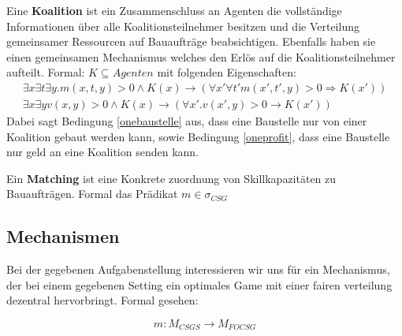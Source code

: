 \begin{definition}[Koalition]
  Eine \textbf{Koalition} ist ein Zusammenschluss an Agenten die vollständige Informationen über alle Koalitionsteilnehmer besitzen und die Verteilung gemeinsamer Ressourcen auf Bauaufträge beabsichtigen. Ebenfalls haben sie einen gemeinsamen Mechanismus welches den Erlös auf die Koalitionsteilnehmer aufteilt. Formal: $K\subseteq Agenten$ mit folgenden Eigenschaften:
  \begin{align}
    \exists x\exists t\exists y. m(x,t,y) > 0 \land K(x)\rightarrow (\forall x'\forall t' m(x',t',y) > 0\Rightarrow K(x')) \label{onebaustelle} \\
    \exists x\exists y v(x,y) > 0 \land K(x) \rightarrow (\forall x'.v(x', y) > 0 \rightarrow K(x')) \label{oneprofit}
  \end{align}
  Dabei sagt Bedingung \ref{onebaustelle} aus, dass eine Baustelle nur von einer Koalition gebaut werden kann, sowie Bedingung \ref{oneprofit}, dass eine Baustelle nur geld an eine Koalition senden kann.
\end{definition}

\begin{definition}[Matching]
  Ein \textbf{Matching} ist eine Konkrete zuordnung von Skillkapazitäten zu Bauaufträgen.
  Formal das Prädikat $m\in\sigma_{CSG}$
\end{definition}



\subsection{Mechanismen}



Bei der gegebenen Aufgabenstellung interessieren wir uns für ein Mechanismus, der bei einem gegebenen Setting ein optimales Game mit einer fairen verteilung dezentral hervorbringt. Formal gesehen:

\begin{equation}
  m: M_{CSGS} \rightarrow M_{FOCSG}
\end{equation}
